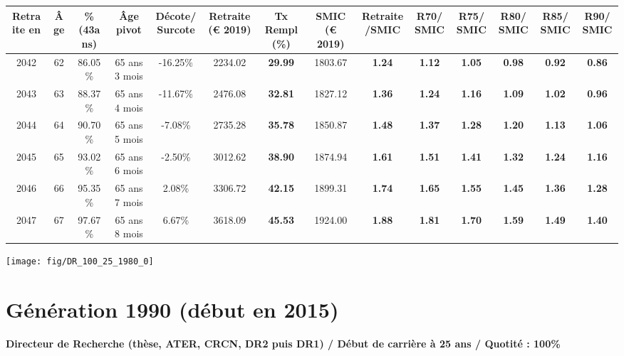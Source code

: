 \begin{adjustbox}{max width=\textwidth} 
\begin{tabular}[htb]{|c|c||c|c|c||c|c||c|c||c|c|c|c|c|} 
\hline 
 Retraite en &  Âge &  \%(43ans) &  Âge pivot &  Décote/Surcote &  Retraite (\euro{} 2019) &  Tx Rempl(\%) &  SMIC (\euro{} 2019) &  Retraite/SMIC &  R70/SMIC &  R75/SMIC &  R80/SMIC &  R85/SMIC &  R90/SMIC \\ 
\hline \hline 
 2042 &  62 &  86.05\% &  65 ans 3 mois &  -16.25\% &  2234.02 &  {\bf 29.99} &  1803.67 &  {\bf 1.24} &  {\bf 1.12} &  {\bf 1.05} &  {\bf {\color{red} 0.98}} &  {\bf {\color{red} 0.92}} &  {\bf {\color{red} 0.86}} \\ 
\hline 
 2043 &  63 &  88.37\% &  65 ans 4 mois &  -11.67\% &  2476.08 &  {\bf 32.81} &  1827.12 &  {\bf 1.36} &  {\bf 1.24} &  {\bf 1.16} &  {\bf 1.09} &  {\bf 1.02} &  {\bf {\color{red} 0.96}} \\ 
\hline 
 2044 &  64 &  90.70\% &  65 ans 5 mois &  -7.08\% &  2735.28 &  {\bf 35.78} &  1850.87 &  {\bf 1.48} &  {\bf 1.37} &  {\bf 1.28} &  {\bf 1.20} &  {\bf 1.13} &  {\bf 1.06} \\ 
\hline 
 2045 &  65 &  93.02\% &  65 ans 6 mois &  -2.50\% &  3012.62 &  {\bf 38.90} &  1874.94 &  {\bf 1.61} &  {\bf 1.51} &  {\bf 1.41} &  {\bf 1.32} &  {\bf 1.24} &  {\bf 1.16} \\ 
\hline 
 2046 &  66 &  95.35\% &  65 ans 7 mois &  2.08\% &  3306.72 &  {\bf 42.15} &  1899.31 &  {\bf 1.74} &  {\bf 1.65} &  {\bf 1.55} &  {\bf 1.45} &  {\bf 1.36} &  {\bf 1.28} \\ 
\hline 
 2047 &  67 &  97.67\% &  65 ans 8 mois &  6.67\% &  3618.09 &  {\bf 45.53} &  1924.00 &  {\bf 1.88} &  {\bf 1.81} &  {\bf 1.70} &  {\bf 1.59} &  {\bf 1.49} &  {\bf 1.40} \\ 
\hline 
\hline 
\end{tabular} 
\end{adjustbox} 
 
 \vspace{0.1cm} 

 {\hspace{-2.2cm}\texttt{[image: fig/DR\_100\_25\_1980\_0]}} 

\newpage 
 
\section{Génération 1990 (début en 2015)\label{DR_100_25_1990_0}} 
 
{\bf \noindent Directeur de Recherche (thèse, ATER, CRCN, DR2 puis DR1) / Début de carrière à 25 ans / Quotité : 100\%}  ~ 

